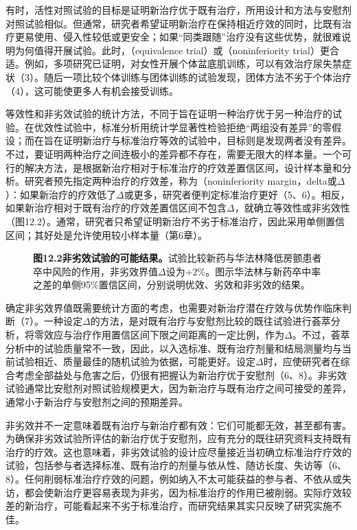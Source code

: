 有时，活性对照试验的目标是证明新治疗优于既有治疗，所用设计和方法与安慰剂对照试验相似。但通常，研究者希望证明新治疗在保持相近疗效的同时，比既有治疗更易使用、侵入性较低或更安全；如果“同类跟随”治疗没有这些优势，就很难说明为何值得开展试验。此时，（equivalence trial）或（noninferiority trial）更合适。例如，多项研究已证明，对女性开展个体盆底肌训练，可以有效治疗尿失禁症状（3）。随后一项比较个体训练与团体训练的试验发现，团体方法不劣于个体治疗（4），这可能使更多人有机会接受训练。

等效性和非劣效试验的统计方法，不同于旨在证明一种治疗优于另一种治疗的试验。在优效性试验中，标准分析用统计学显著性检验拒绝“两组没有差异”的零假设；而在旨在证明新治疗与标准治疗等效的试验中，目标则是发现两者没有差异。不过，要证明两种治疗之间连极小的差异都不存在，需要无限大的样本量。一个可行的解决方法，是根据新治疗相对于标准治疗的疗效差置信区间，设计样本量和分析。研究者预先指定两种治疗的疗效差，称为（noninferiority margin，delta或$\Delta$）：如果新治疗的疗效低了$\Delta$或更多，研究者便判定标准治疗更好（5、6）。相反，如果新治疗相对于既有治疗的疗效差置信区间不包含$\Delta$，就确立等效性或非劣效性（图12.2）。通常，研究者只希望证明新治疗不劣于标准治疗，因此采用单侧置信区间；其好处是允许使用较小样本量（第6章）。
\begin{figure}[htbp]\centering\chTwelveNoninferiority
\caption*{\textbf{图12.2\quad 非劣效试验的可能结果。}试验比较新药与华法林降低房颤患者卒中风险的作用，非劣效界值$\Delta$设为$+2\%$。图示华法林与新药卒中率之差的单侧95\%置信区间，分别说明优效、劣效和非劣效的结果。}
\end{figure}

确定非劣效界值既需要统计方面的考虑，也需要对新治疗潜在疗效与优势作临床判断（7）。一种设定$\Delta$的方法，是对既有治疗与安慰剂比较的既往试验进行荟萃分析，将零效应与治疗作用置信区间下限之间距离的一定比例，作为$\Delta$。不过，荟萃分析中的试验质量常不一致，因此，以入选标准、既有治疗剂量和结局测量均与当前试验相近、质量最佳的随机试验为依据，可能更好。设定$\Delta$时，应使研究者在综合考虑全部益处与危害之后，仍很有把握认为新治疗优于安慰剂（6、8）。非劣效试验通常比安慰剂对照试验规模更大，因为新治疗与既有治疗之间可接受的差异，通常小于新治疗与安慰剂之间的预期差异。

非劣效并不一定意味着既有治疗与新治疗都有效：它们可能都无效，甚至都有害。为确保非劣效试验所评估的新治疗优于安慰剂，应有充分的既往研究资料支持既有治疗的疗效。这也意味着，非劣效试验的设计应尽量接近当初确立标准治疗疗效的试验，包括参与者选择标准、既有治疗的剂量与依从性、随访长度、失访等（6、8）。任何削弱标准治疗疗效的问题，例如纳入不太可能获益的参与者、不依从或失访，都会使新治疗更容易表现为非劣，因为标准治疗的作用已被削弱。实际疗效较差的新治疗，可能看起来不劣于标准治疗，而研究结果其实只反映了研究实施不佳。

